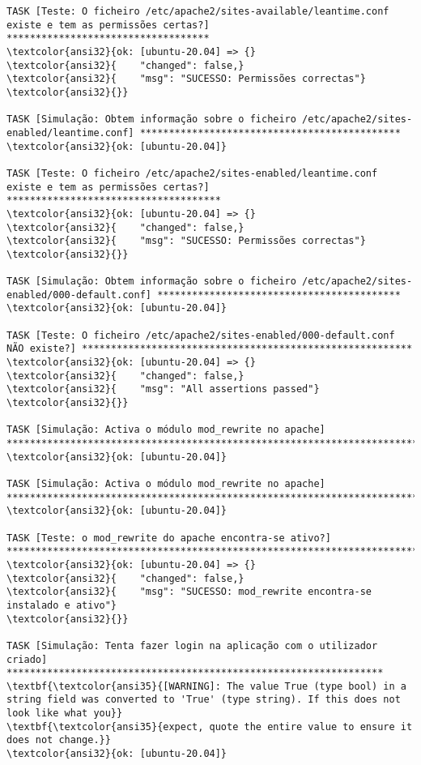 \documentclass{scrartcl}
\begin{document}
\begin{Verbatim}
TASK [Teste: O ficheiro /etc/apache2/sites-available/leantime.conf existe e tem as permissões certas?] ***********************************
\textcolor{ansi32}{ok: [ubuntu-20.04] => {}
\textcolor{ansi32}{    "changed": false,}
\textcolor{ansi32}{    "msg": "SUCESSO: Permissões correctas"}
\textcolor{ansi32}{}}

TASK [Simulação: Obtem informação sobre o ficheiro /etc/apache2/sites-enabled/leantime.conf] *********************************************
\textcolor{ansi32}{ok: [ubuntu-20.04]}

TASK [Teste: O ficheiro /etc/apache2/sites-enabled/leantime.conf existe e tem as permissões certas?] *************************************
\textcolor{ansi32}{ok: [ubuntu-20.04] => {}
\textcolor{ansi32}{    "changed": false,}
\textcolor{ansi32}{    "msg": "SUCESSO: Permissões correctas"}
\textcolor{ansi32}{}}

TASK [Simulação: Obtem informação sobre o ficheiro /etc/apache2/sites-enabled/000-default.conf] ******************************************
\textcolor{ansi32}{ok: [ubuntu-20.04]}

TASK [Teste: O ficheiro /etc/apache2/sites-enabled/000-default.conf NÃO existe?] *********************************************************
\textcolor{ansi32}{ok: [ubuntu-20.04] => {}
\textcolor{ansi32}{    "changed": false,}
\textcolor{ansi32}{    "msg": "All assertions passed"}
\textcolor{ansi32}{}}

TASK [Simulação: Activa o módulo mod_rewrite no apache] **********************************************************************************
\textcolor{ansi32}{ok: [ubuntu-20.04]}

TASK [Simulação: Activa o módulo mod_rewrite no apache] **********************************************************************************
\textcolor{ansi32}{ok: [ubuntu-20.04]}

TASK [Teste: o mod_rewrite do apache encontra-se ativo?] *********************************************************************************
\textcolor{ansi32}{ok: [ubuntu-20.04] => {}
\textcolor{ansi32}{    "changed": false,}
\textcolor{ansi32}{    "msg": "SUCESSO: mod_rewrite encontra-se instalado e ativo"}
\textcolor{ansi32}{}}

TASK [Simulação: Tenta fazer login na aplicação com o utilizador criado] *****************************************************************
\textbf{\textcolor{ansi35}{[WARNING]: The value True (type bool) in a string field was converted to 'True' (type string). If this does not look like what you}}
\textbf{\textcolor{ansi35}{expect, quote the entire value to ensure it does not change.}}
\textcolor{ansi32}{ok: [ubuntu-20.04]}


\end{Verbatim}
\end{document}
